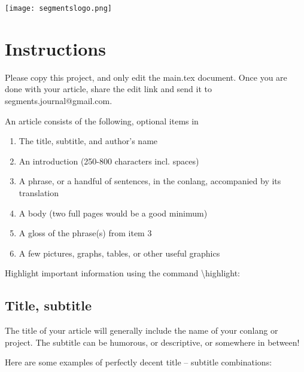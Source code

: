 
\begin{center}
    \texttt{[image: segmentslogo.png]}
\end{center}

\pagestyle{empty}

\section*{Instructions}


Please copy this project, and only edit the {\color{purplevivid} main.tex} document. Once you are done with your article, share the {\color{purplevivid} edit} link and send it to {\color{purplevivid} segments.journal@gmail.com}.

An article consists of the following, optional items in 

\begin{enumerate}
    \item The title, subtitle, and author's name
    \item An introduction (250-800 characters incl. spaces)
    \item A phrase, or a handful of sentences, in the conlang, accompanied by its translation
    \item A body (two full pages would be a good minimum)
    \item {\color{purplevivid}A gloss of the phrase(s) from item 3}
    \item {\color{purplevivid}A few pictures, graphs, tables, or other useful graphics}
\end{enumerate}

Highlight important information using the command \textbackslash highlight: 

\subsection*{Title, subtitle}

The title of your article will generally include the name of your conlang or project. The subtitle can be humorous, or descriptive, or somewhere in between!

Here are some examples of perfectly decent title -- subtitle combinations:


